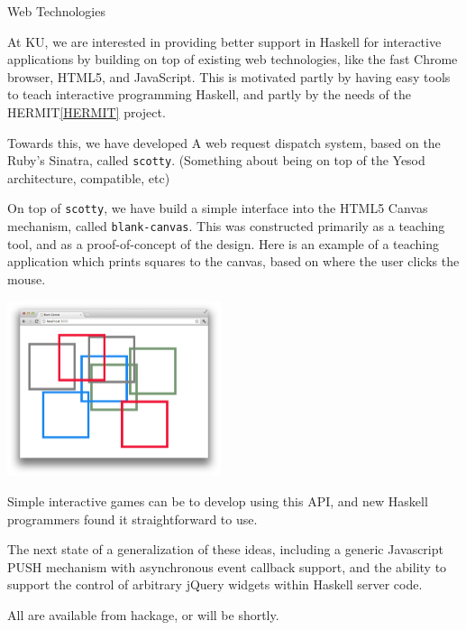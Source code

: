 \begin{hcarentry}{Web Technologies}
\label{kuwebtech}
\makeheader

At KU, we are interested in providing better support in Haskell for
interactive applications by building on top of existing web technologies,
like the fast Chrome browser, HTML5, and JavaScript. This is motivated
partly by having easy tools to teach interactive programming Haskell,
and partly by the needs of the HERMIT\cref{HERMIT} project.

Towards this, we have developed
A web request dispatch system, based on the Ruby's Sinatra, called {\tt scotty}.
(Something about being on top of the Yesod architecture, compatible, etc)

On top of {\tt scotty}, we have build a simple interface 
into the HTML5 Canvas mechanism, called {\tt blank-canvas}.
This was constructed primarily as a teaching tool, and as
a proof-of-concept of the design. Here is an example of
a teaching application which prints squares to the canvas,
based on where the user clicks the mouse.

\includegraphics[width=0.47\textwidth]{html/squares.png}

Simple interactive games can be to develop using this API,
and new Haskell programmers found it straightforward to use.

The next state of a generalization of these ideas, including
a generic Javascript PUSH mechanism with asynchronous event callback support,
and the ability to support the control of arbitrary jQuery widgets within
Haskell server code.

All are available from hackage, or will be shortly. 
\end{hcarentry}

